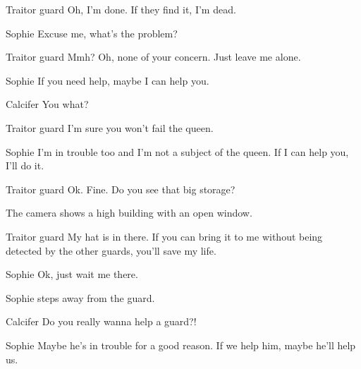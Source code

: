 \begin{screenplay}

\begin{dialogue}[forlorn]{Traitor guard}
Oh, I'm done. If they find it, I'm dead.
\end{dialogue}

\begin{dialogue}{Sophie}
Excuse me, what's the problem?
\end{dialogue}

\begin{dialogue}[forlorn]{Traitor guard}
Mmh? Oh, none of your concern. Just leave me alone.
\end{dialogue}

\begin{dialogue}{Sophie}
If you need help, maybe I can help you.
\end{dialogue}

\begin{dialogue}[surprised]{Calcifer}
You what?
\end{dialogue}

\begin{dialogue}[forlorn]{Traitor guard}
I'm sure you won't fail the queen.
\end{dialogue}

\begin{dialogue}{Sophie}
I'm in trouble too and I'm not a subject of the queen. If I can help you, I'll do it.
\end{dialogue}

\begin{dialogue}[weird]{Traitor guard}
Ok. Fine. Do you see that big storage?
\end{dialogue}

The camera shows a high building with an open window.

\begin{dialogue}[continuing]{Traitor guard}
My hat is in there. If you can bring it to me without being detected by the other guards, you'll save my life.
\end{dialogue}

\begin{dialogue}{Sophie}
Ok, just wait me there.
\end{dialogue}

Sophie steps away from the guard.

\begin{dialogue}[disappointed]{Calcifer}
Do you really wanna help a guard?!
\end{dialogue}

\begin{dialogue}{Sophie}
Maybe he's in trouble for a good reason. If we help him, maybe he'll help us.
\end{dialogue}

\end{screenplay}

